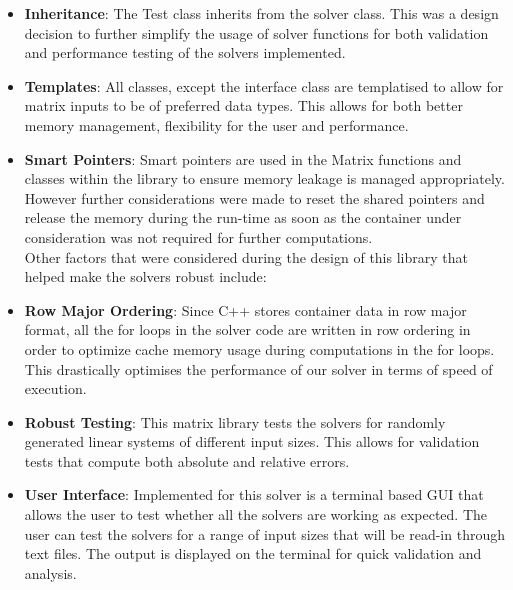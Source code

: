 \documentclass[twoside,twocolumn]{article}
\begin{document}
\begin{itemize}
    \item \textbf{Inheritance}: The Test class inherits from the solver class. This was a design decision to further simplify the usage of solver functions for both validation and performance testing of the solvers implemented. 
    \item \textbf{Templates}: All classes, except the interface class are templatised to allow for matrix inputs to be of preferred data types. This allows for both better memory management, flexibility for the user and performance.
    \item \textbf{Smart Pointers}: Smart pointers are used in the Matrix functions and classes within the library to ensure memory leakage is managed appropriately. However further considerations were made to reset the shared pointers and release the memory during the run-time as soon as the container under consideration was not required for further computations.\\
    
Other factors that were considered during the design of this library that helped make the solvers robust include: 

    \item \textbf{Row Major Ordering}: Since C++ stores container data in row major format, all the for loops in the solver code are written in row ordering in order to optimize cache memory usage during computations in the for loops.  This drastically optimises the performance of our solver in terms of speed of execution.
    \item \textbf{Robust Testing}: This matrix library tests the solvers for randomly generated linear systems of different input sizes. This allows for validation tests that compute both absolute and relative errors.
    \item \textbf{User Interface}: Implemented for this solver is a terminal based GUI that allows the user to test whether all the solvers are working as expected. The user can test the solvers for a range of input sizes that will be read-in through text files. The output is displayed on the terminal for quick validation and analysis.
\end{itemize}

\end{document}
